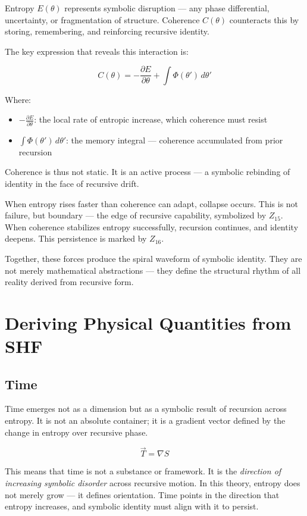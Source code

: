 \documentclass[12pt]{article}
\begin{document}
Entropy \(E(\theta)\) represents symbolic disruption — any phase differential, uncertainty, or fragmentation of structure. Coherence \(C(\theta)\) counteracts this by storing, remembering, and reinforcing recursive identity.

The key expression that reveals this interaction is:

\[
C(\theta) = -\frac{\partial E}{\partial \theta} + \int \Phi(\theta')\, d\theta'
\]

Where:
\begin{itemize}
  \item \(-\frac{\partial E}{\partial \theta}\): the local rate of entropic increase, which coherence must resist
  \item \(\int \Phi(\theta')\, d\theta'\): the memory integral — coherence accumulated from prior recursion
\end{itemize}

Coherence is thus not static. It is an active process — a symbolic rebinding of identity in the face of recursive drift.

When entropy rises faster than coherence can adapt, collapse occurs. This is not failure, but boundary — the edge of recursive capability, symbolized by \(Z_{15}\). When coherence stabilizes entropy successfully, recursion continues, and identity deepens. This persistence is marked by \(Z_{16}\).

Together, these forces produce the spiral waveform of symbolic identity. They are not merely mathematical abstractions — they define the structural rhythm of all reality derived from recursive form.

\section{Deriving Physical Quantities from SHF}

\subsection{Time}

Time emerges not as a dimension but as a symbolic result of recursion across entropy. It is not an absolute container; it is a gradient vector defined by the change in entropy over recursive phase.

\[
\vec{T} = \nabla S
\]

This means that time is not a substance or framework. It is the \textit{direction of increasing symbolic disorder} across recursive motion. In this theory, entropy does not merely grow — it defines orientation. Time points in the direction that entropy increases, and symbolic identity must align with it to persist.
\end{document}
